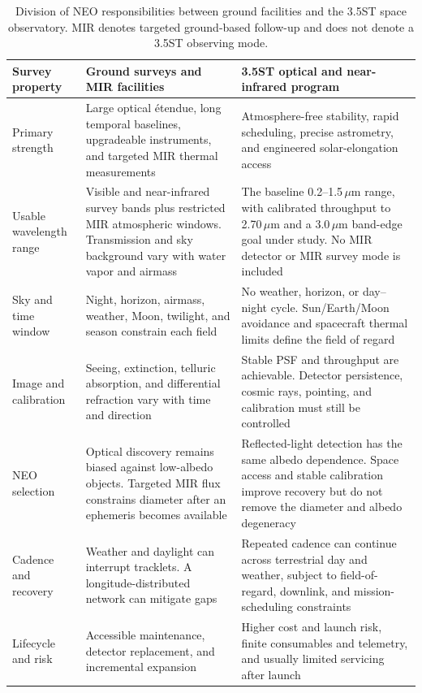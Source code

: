 \begin{table}[H]
\centering
\caption{Division of NEO responsibilities between ground facilities and
the 3.5ST space observatory. MIR denotes targeted ground-based follow-up and
does not denote a 3.5ST observing mode.}
\small
\begin{tabularx}{\textwidth}{@{}P{30mm}YY@{}}
\toprule
\textbf{\color{cGold}Survey property} &
\textbf{\color{cGold}Ground surveys and MIR facilities} &
\textbf{\color{cGold}3.5ST optical and near-infrared program}\\
\midrule
Primary strength &
Large optical étendue, long temporal baselines, upgradeable instruments,
and targeted MIR thermal measurements &
Atmosphere-free stability, rapid scheduling, precise astrometry, and
engineered solar-elongation access\\
\addlinespace
Usable wavelength range &
Visible and near-infrared survey bands plus restricted MIR atmospheric
windows. Transmission and sky background vary with water vapor and airmass &
The baseline 0.2--1.5\,$\mu$m range, with calibrated throughput to
2.70\,$\mu$m and a 3.0\,$\mu$m band-edge goal under study. No MIR detector or
MIR survey mode is included\\
\addlinespace
Sky and time window &
Night, horizon, airmass, weather, Moon, twilight, and season constrain each
field &
No weather, horizon, or day--night cycle. Sun/Earth/Moon avoidance and
spacecraft thermal limits define the field of regard\\
\addlinespace
Image and calibration &
Seeing, extinction, telluric absorption, and differential refraction vary
with time and direction &
Stable PSF and throughput are achievable. Detector persistence, cosmic
rays, pointing, and calibration must still be controlled\\
\addlinespace
NEO selection &
Optical discovery remains biased against low-albedo objects. Targeted MIR
flux constrains diameter after an ephemeris becomes available &
Reflected-light detection has the same albedo dependence. Space access and
stable calibration improve recovery but do not remove the diameter and
albedo degeneracy\\
\addlinespace
Cadence and recovery &
Weather and daylight can interrupt tracklets. A longitude-distributed
network can mitigate gaps &
Repeated cadence can continue across terrestrial day and weather, subject
to field-of-regard, downlink, and mission-scheduling constraints\\
\addlinespace
Lifecycle and risk &
Accessible maintenance, detector replacement, and incremental expansion &
Higher cost and launch risk, finite consumables and telemetry, and usually
limited servicing after launch\\
\bottomrule
\end{tabularx}
\label{tab:ground-space-neo}
\end{table}


